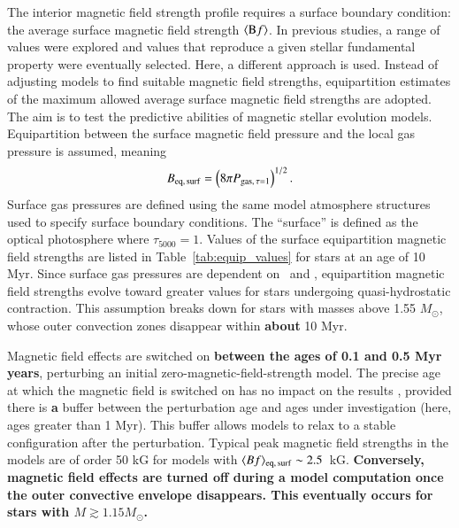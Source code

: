 \documentclass{aa}
\begin{document}
The interior magnetic field strength profile requires a surface boundary condition: the average surface magnetic field strength $\langle{\rm B}f\rangle$. In previous studies, a range of values were explored and values that reproduce a given stellar fundamental property were eventually selected. 
Here, a different approach is used. Instead of adjusting models to find suitable magnetic field strengths, equipartition estimates of the maximum allowed average surface magnetic field strengths are adopted. The aim is to test the predictive abilities of magnetic stellar evolution models. Equipartition between the surface magnetic field pressure and the local gas pressure is assumed, meaning
\begin{equation}
    B_{\rm eq,\, surf} = \left(8\pi P_{{\rm gas},\, \tau = 1}\right)^{1/2}.
\end{equation}
Surface gas pressures are defined using the same model atmosphere structures used to specify surface boundary conditions. The ``surface'' is defined as the optical photosphere where $\tau_{5000} = 1$. Values of the surface equipartition magnetic field strengths are listed in Table~\ref{tab:equip_values} for stars at an age of 10 Myr. Since surface gas pressures are dependent on \logg\ and \teff, equipartition magnetic field strengths evolve toward greater values for stars undergoing quasi-hydrostatic contraction. This assumption breaks down for stars with masses above 1.55 $M_{\odot}$, whose outer convection zones disappear within {\bf about} 10 Myr.

Magnetic field effects are switched on {\bf between the ages of 0.1 and 0.5 Myr years}, perturbing an initial zero-magnetic-field-strength model. The precise age at which the magnetic field is switched on has no impact on the results \citep{FC12b}, provided there is {\bf a} buffer between the perturbation age and ages under investigation (here, ages greater than 1 Myr). This buffer allows models to relax to a stable configuration after the perturbation. Typical peak magnetic field strengths in the models are of order 50 kG for models with $\langle Bf \rangle_{\rm eq,\,surf} \sim 2.5$~kG. 
{\bf Conversely, magnetic field effects are turned off during a model computation once the outer convective envelope disappears. This eventually occurs for stars with $M \gtrsim 1.15 M_{\odot}$.}
\end{document}
